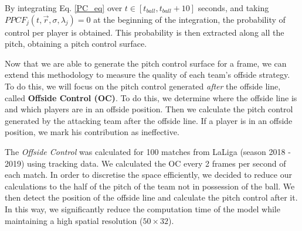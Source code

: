 \documentclass[
  twoside,nohyper]{book}
\begin{document}
By integrating Eq. \ref{PC_eq} over \(t \in \left[ t_{ball},t_{ball} + 10 \right]\) seconds, and taking \(P P C F_j\left(t, \vec{r} , \sigma, \lambda_j\right) = 0\) at the beginning of the integration, the probability of control per player is obtained. This probability is then extracted along all the pitch, obtaining a pitch control surface.

Now that we are able to generate the pitch control surface for a frame, we can extend this methodology to measure the quality of each team's offside strategy. To do this, we will focus on the pitch control generated \emph{after} the offside line, called \textbf{Offside Control (OC)}. To do this, we determine where the offside line is and which players are in an offside position. Then we calculate the pitch control generated by the attacking team after the offside line. If a player is in an offside position, we mark his contribution as ineffective.

The \emph{Offside Control} was calculated for 100 matches from LaLiga (season 2018 - 2019) using tracking data. We calculated the OC every 2 frames per second of each match. In order to discretise the space efficiently, we decided to reduce our calculations to the half of the pitch of the team not in possession of the ball. We then detect the position of the offside line and calculate the pitch control after it. In this way, we significantly reduce the computation time of the model while maintaining a high spatial resolution (\(50 \times 32\)).

  
\end{document}
